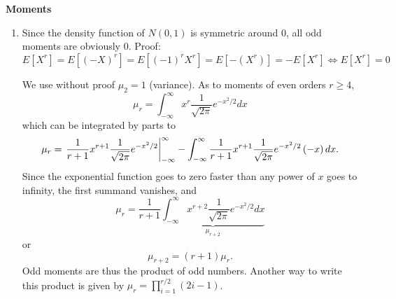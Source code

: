 \begin{Solution}{6.1}
\textbf{Moments}

\begin{enumerate}
\item Since the density function of $N(0,1)$ is symmetric around 0, all
    odd moments are obviously 0. Proof:
    \begin{equation*}
      E[X^r] = E[(-X)^r] = E[(-1)^r X^r] = E[-(X^r)]=-E[X^r]\Leftrightarrow E[X^r] = 0
    \end{equation*}

    We use without proof $\mu _{2}=1$ (variance). As to moments of even
    orders $r\geq 4$,
\begin{equation*}
\mu _{r}=\int_{-\infty }^{\infty }x^{r}\frac{1}{\sqrt{2\pi }}e^{-x^{2}/2}dx
\end{equation*}%
which can be integrated by parts to
\begin{equation*}
\mu _{r}=\left. \frac{1}{r+1}x^{r+1}\frac{1}{\sqrt{2\pi }}%
e^{-x^{2}/2}\right\vert _{-\infty }^{\infty }-\int_{-\infty }^{\infty }\frac{%
1}{r+1}x^{r+1}\frac{1}{\sqrt{2\pi }}e^{-x^{2}/2}\left( -x\right) dx.
\end{equation*}%
Since the exponential function goes to zero faster than any power of $x$
goes to infinity, the first summand vanishes, and%
\begin{equation*}
\mu _{r}=\frac{1}{r+1}\underbrace{\int_{-\infty }^{\infty }x^{r+2}\frac{1}{\sqrt{2\pi }}e^{-x^{2}/2}dx}_{\mu_{r+2}}
\end{equation*}%
or%
\begin{equation*}
\mu _{r+2}=\left( r+1\right) \mu _{r}.
\end{equation*}%
Odd moments are thus the product of odd numbers. Another way to write
this product is given by $\mu _{r}=\prod_{i=1}^{r/2}\left( 2i-1\right) $.


\end{enumerate}
\end{Solution}
